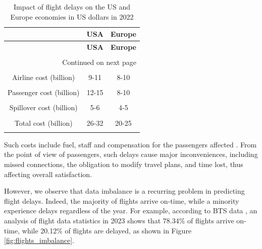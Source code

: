 \documentclass[12pt,oneside]{book} %
\begin{document}
\begin{longtable}{c c c}
\caption{Impact of flight delays on the US and Europe economies in US dollars in 2022 \cite{AirHelp}}
\label{tab:flight_delays_costs}  \\

\hline
  & \textbf{USA} & \textbf{Europe} \\ \hline
\endfirsthead

\hline
  & \textbf{USA} & \textbf{Europe}  \\ \hline
\\
\endhead

\hline \multicolumn{3}{r}{{Continued on next page}} \\ \hline
\endfoot

\hline
\endlastfoot

& & 
\\
Airline cost (billion)
& 9-11
& 8-10
\\
& & 
\\
Passenger cost (billion)
& 12-15
& 8-10
\\
& &
\\
Spillover cost (billion)
& 5-6
& 4-5
\\
& &
\\
Total cost (billion)
& 26-32
& 20-25
\\
& &
\\
\end{longtable}
\vspace{0.3cm}
\noindent Such costs include fuel, staff and compensation for the passengers affected \cite{AirHelp}. From the point of view of passengers, such delays cause major inconveniences, including missed connections, the obligation to modify travel plans, and time lost, thus affecting overall satisfaction.

\noindent However, we observe that data imbalance is a recurring problem in predicting flight delays. Indeed, the majority of flights arrive on-time, while a minority experience delays regardless of the year. For example, according to BTS data \cite{BTS_flight_delays_statistics}, an analysis of flight data statistics in 2023 shows that 78.34\% of flights arrive on-time, while 20.12\% of flights are delayed, as shown in Figure \ref{fig:flights_imbalance}.
\end{document}
